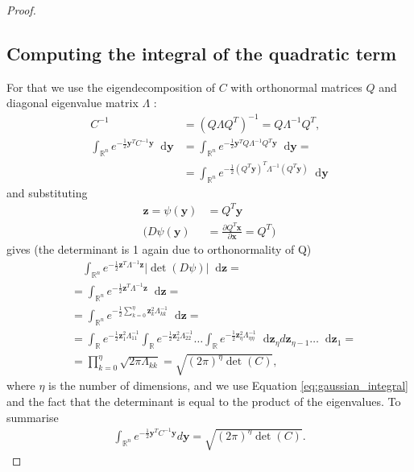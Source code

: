 \documentclass{paper}
\newcommand{\abs}[1]{\left| #1 \right|}
\newcommand{\vr}[1]{\ensuremath{\boldsymbol{#1}}}
\newcommand{\f}[1]{#1}
\newcommand*\diff{\mathop{}\!\mathrm{d}}
\newcommand{\yvec}[0]{\ensuremath{\vr{y}}}
\newcommand{\zvec}[0]{\ensuremath{\vr{z}}}
\begin{document}
\begin{proof}
\subsection*{Computing the integral of the quadratic term}
For that we use the eigendecomposition of $C$ with orthonormal matrices $Q$ and diagonal eigenvalue matrix $\Lambda$ \cite{wiki_eigendecomp}:
\begin{align*}
	C^{-1} &= (Q \Lambda Q^T)^{-1} = Q \Lambda^{-1} Q^T, \nonumber \\
	\int_{\mathbb{R}^n} e^{-\frac{1}{2} \yvec^T C^{-1} \yvec}  \diff \yvec
	&= \int_{\mathbb{R}^n} e^{-\frac{1}{2} \yvec^T Q \Lambda^{-1} Q^T \yvec}  \diff \yvec =  \nonumber \\
	&= \int_{\mathbb{R}^n} e^{-\frac{1}{2} (Q^T \yvec)^T \Lambda^{-1} (Q^T \yvec)}  \diff \yvec
\end{align*}
and substituting
\begin{align*}
\zvec = \psi(\yvec) &= Q^T \yvec \\
\Bigg( \f{D}\psi(\yvec) &= \frac{\partial Q^T \vr{x}}{\partial \vr{x}} = Q^T \Bigg)
\end{align*}
gives (the determinant is 1 again due to orthonormality of Q)
\begin{align*}
	&\quad \int_{\mathbb{R}^n} e^{-\frac{1}{2} \zvec^T \Lambda^{-1} \zvec} \abs{\det(\f{D}\psi)} \diff \zvec =\\
	&= \int_{\mathbb{R}^n} e^{-\frac{1}{2} \zvec^T \Lambda^{-1} \zvec} \diff \zvec =\\
	&= \int_{\mathbb{R}^n} e^{-\frac{1}{2} \sum_{k=0}^\eta \zvec_k^2 \Lambda_{kk}^{-1} } \diff \zvec =\\
	&= \int_{\mathbb{R}} e^{-\frac{1}{2} \zvec_1^2 \Lambda_{11}^{-1} } \int_{\mathbb{R}} e^{-\frac{1}{2} \zvec_2^2 \Lambda_{22}^{-1} } \dots \int_{\mathbb{R}} e^{-\frac{1}{2} \zvec_\eta^2 \Lambda_{\eta\eta}^{-1} } \diff \zvec_\eta d\zvec_{\eta-1} \dots \diff \zvec_1 =\\
	&= \prod_{k=0}^\eta \sqrt{2 \pi \Lambda_{kk}} = \sqrt{(2 \pi)^\eta \det(C)},
\end{align*}
where $\eta$ is the number of dimensions, and we use Equation \ref{eq:gaussian_integral} and the fact that the determinant is equal to the product of the eigenvalues. To summarise
\begin{align}
	\int_{\mathbb{R}^n} e^{-\frac{1}{2} \yvec^T C^{-1} \yvec}  d\yvec = \sqrt{(2 \pi)^\eta \det(C)}.
\end{align}


\end{proof}
\end{document}
